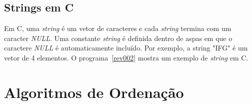 \documentclass[11pt,fleqn]{book} %
\begin{document}
\subsection*{Strings em C}
Em C, uma \textit{string} é um vetor de caracteres e cada \textit{string} termina com um caracter \textit{NULL}.
Uma constante \textit{string} é definida dentro de aspas em que o caractere \textit{NULL} é automaticamente incluído.
Por exemplo, a string "IFG" é um vetor de 4 elementos.
O programa~\ref{rev002} mostra um exemplo de \textit{string} em C. 
\label{rev002}

\newpage
\section{Algoritmos de Ordenação}\label{ordenacao}
\end{document}
